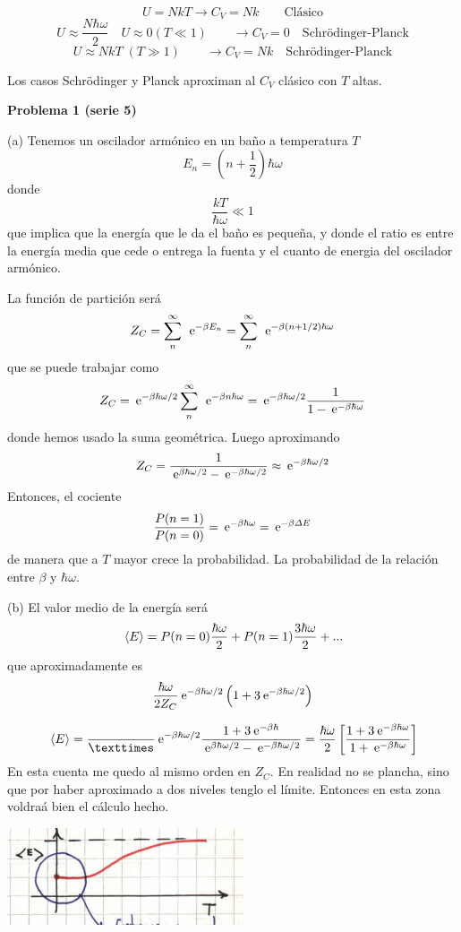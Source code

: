 \documentclass[10pt,oneside]{CBFT_book}
\begin{document}
\[
	U = NkT \rightarrow C_V = Nk  \qquad \text{Clásico}
\]
\[
	U \approx \frac{N\hbar\omega}{2} \quad U \approx 0 (T\ll 1) \qquad \rightarrow C_V = 0 
	\quad \text{Schrödinger-Planck}
\]
\[
	U \approx N kT \; (T \gg 1) \qquad \rightarrow C_V = Nk 
	\quad \text{Schrödinger-Planck}
\]

Los casos Schrödinger y Planck aproximan al $C_V$ clásico con $T$ altas.

\begin{ejemplo}{\bf Problema 1 (serie 5)}

(a) Tenemos un oscilador armónico en un baño a temperatura $T$
\[
	E_n = \left( n + \frac 1 2 \right) \hbar \omega 
\]
donde
\[
	\frac {k T} { \hbar \omega } \ll 1
\]
que implica que la energía que le da el baño es pequeña, y donde el ratio es entre la energía media
que cede o entrega la fuenta y el cuanto de energia del oscilador armónico.

La función de partición será
\[
	Z_C = \sum_n^\infty  \: \:\mathrm{e}^{ - \beta E_n } =  \sum_n^\infty  \: \:\mathrm{e}^{ - \beta (n+1/2) \hbar\omega }
\]
que se puede trabajar como
\[
	Z_C = \:\mathrm{e}^{ - \beta\hbar\omega/2 } \sum_n^\infty  \: \:\mathrm{e}^{ - \beta n \hbar\omega }
	= \:\mathrm{e}^{ - \beta\hbar\omega/2 } \frac{1}{ 1 -\:\mathrm{e}^{ - \beta \hbar\omega } }
\]
donde hemos usado la suma geométrica. Luego aproximando
\[
	Z_C = \frac{1}{ \:\mathrm{e}^{ \beta \hbar\omega /2 } - \:\mathrm{e}^{ - \beta \hbar\omega/2 } } \approx 
	\:\mathrm{e}^{ - \beta \hbar\omega /2 }
\]
Entonces, el cociente
\[
	\frac{P(n=1)}{P(n=0)} = \:\mathrm{e}^{ - \beta \hbar\omega } = \:\mathrm{e}^{ - \beta \Delta E }
\]
de manera que a $T$ mayor crece la probabilidad. La probabilidad de la relación entre $ \beta $ y $\hbar \omega$.


(b) El valor medio de la energía será
\[
	\:\left\langle E \right\rangle = P (n=0) \frac{\hbar \omega}{2} + P(n=1)\frac{3\hbar \omega}{2} + ...
\]
que aproximadamente es
\[
	\frac{\hbar \omega}{2Z_C}  \:\mathrm{e}^{ - \beta \hbar\omega/2 } 
	\left( 1 +  3 \:\mathrm{e}^{ -\beta\hbar\omega/2 } \right)
\]

\[
	\vm{E} = \frac{}{×}  \euler^{ - \beta \hbar\omega/2 } \frac{ 1 + 3 \euler^{-\beta \hbar}}
	{\euler^{ \beta \hbar\omega /2 } - \euler^{ - \beta \hbar\omega/2 }  } = \frac{\hbar \omega }{2}
	\left[ \frac{1 + 3 \euler^{ -\beta\hbar\omega } }{ 1 + \euler^{ -\beta\hbar\omega } } \right]
\]
En esta cuenta me quedo al mismo orden en $Z_C$.
En realidad no se plancha, sino que por haber aproximado a dos niveles tenglo el límite.
Entonces en esta zona voldraá bien el cálculo hecho.

\includegraphics[scale=0.5]{images/1606329403.jpg} 
 
\end{ejemplo}
\end{document}
